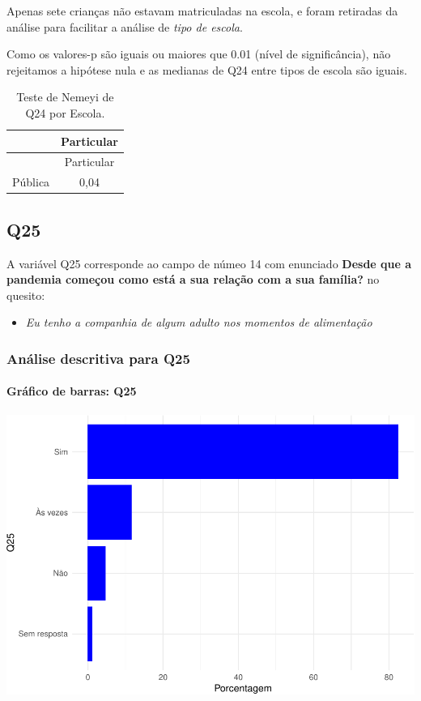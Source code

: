 \documentclass[]{article}
\providecommand{\tightlist}{%
  \setlength{\itemsep}{0pt}\setlength{\parskip}{0pt}}
\let\oldparagraph\paragraph
\renewcommand{\paragraph}[1]{\oldparagraph{#1}\mbox{}}
\begin{document}
Apenas sete crianças não estavam matriculadas na escola, e foram retiradas da análise para facilitar a análise de \emph{tipo de escola}.

Como os valores-p são iguais ou maiores que 0.01 (nível de significância), não rejeitamos a hipótese nula e as medianas de Q24 entre tipos de escola são iguais.

\begin{longtable}[]{@{}lc@{}}
\caption{\label{tab:unnamed-chunk-651}Teste de Nemeyi de Q24 por Escola.}\tabularnewline
\toprule
& Particular\tabularnewline
\midrule
\endfirsthead
\toprule
& Particular\tabularnewline
\midrule
\endhead
Pública & 0,04\tabularnewline
\bottomrule
\end{longtable}

\cleardoublepage

\hypertarget{q25}{%
\subsection{Q25}\label{q25}}

A variável Q25 corresponde ao campo de númeo 14 com enunciado \textbf{Desde que a pandemia começou como está a sua relação com a sua família?} no quesito:

\begin{itemize}
\tightlist
\item
  \emph{Eu tenho a companhia de algum adulto nos momentos de alimentação}
\end{itemize}

\hypertarget{anuxe1lise-descritiva-para-q25}{%
\subsubsection{Análise descritiva para Q25}\label{anuxe1lise-descritiva-para-q25}}

\hypertarget{gruxe1fico-de-barras-q25}{%
\paragraph{Gráfico de barras: Q25}\label{gruxe1fico-de-barras-q25}}

\begin{center}\includegraphics[width=0.75\linewidth]{relatorio_covid19_files/figure-latex/unnamed-chunk-658-1} \end{center}
\end{document}
